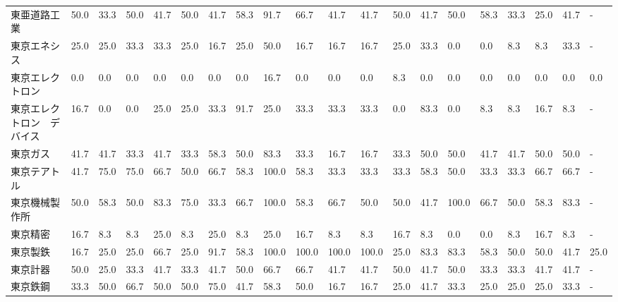 \documentclass[a4paper，11pt]{jsarticle}
\begin{document}
\begin{longtable}[c]{lp{3mm}p{3mm}p{3mm}p{3mm}p{3mm}p{3mm}p{3mm}p{3mm}p{3mm}p{3mm}p{3mm}p{3mm}p{3mm}p{3mm}p{3mm}p{3mm}p{3mm}p{3mm}p{3mm}}
東亜道路工業          &   50.0 &   33.3 &      50.0 &      41.7 &       50.0 &   41.7 &   58.3 &   91.7 &    66.7 &    41.7 &   41.7 &  50.0 &   41.7 &    50.0 &    58.3 &  33.3 &  25.0 &  41.7 &     - \\
東京エネシス          &   25.0 &   25.0 &      33.3 &      33.3 &       25.0 &   16.7 &   25.0 &   50.0 &    16.7 &    16.7 &   16.7 &  25.0 &   33.3 &     0.0 &     0.0 &   8.3 &   8.3 &  33.3 &     - \\
東京エレクトロン        &    0.0 &    0.0 &       0.0 &       0.0 &        0.0 &    0.0 &    0.0 &   16.7 &     0.0 &     0.0 &    0.0 &   8.3 &    0.0 &     0.0 &     0.0 &   0.0 &   0.0 &   0.0 &   0.0 \\
東京エレクトロン　デバイス   &   16.7 &    0.0 &       0.0 &      25.0 &       25.0 &   33.3 &   91.7 &   25.0 &    33.3 &    33.3 &   33.3 &   0.0 &   83.3 &     0.0 &     8.3 &   8.3 &  16.7 &   8.3 &     - \\
東京ガス            &   41.7 &   41.7 &      33.3 &      41.7 &       33.3 &   58.3 &   50.0 &   83.3 &    33.3 &    16.7 &   16.7 &  33.3 &   50.0 &    50.0 &    41.7 &  41.7 &  50.0 &  50.0 &     - \\
東京テアトル          &   41.7 &   75.0 &      75.0 &      66.7 &       50.0 &   66.7 &   58.3 &  100.0 &    58.3 &    33.3 &   33.3 &  33.3 &   58.3 &    50.0 &    33.3 &  33.3 &  66.7 &  66.7 &     - \\
東京機械製作所         &   50.0 &   58.3 &      50.0 &      83.3 &       75.0 &   33.3 &   66.7 &  100.0 &    58.3 &    66.7 &   50.0 &  50.0 &   41.7 &   100.0 &    66.7 &  50.0 &  58.3 &  83.3 &     - \\
東京精密            &   16.7 &    8.3 &       8.3 &      25.0 &        8.3 &   25.0 &    8.3 &   25.0 &    16.7 &     8.3 &    8.3 &  16.7 &    8.3 &     0.0 &     0.0 &   8.3 &  16.7 &   8.3 &     - \\
東京製鉄            &   16.7 &   25.0 &      25.0 &      66.7 &       25.0 &   91.7 &   58.3 &  100.0 &   100.0 &   100.0 &  100.0 &  25.0 &   83.3 &    83.3 &    58.3 &  50.0 &  50.0 &  41.7 &  25.0 \\
東京計器            &   50.0 &   25.0 &      33.3 &      41.7 &       33.3 &   41.7 &   50.0 &   66.7 &    66.7 &    41.7 &   41.7 &  50.0 &   41.7 &    50.0 &    33.3 &  33.3 &  41.7 &  41.7 &     - \\
東京鉄鋼            &   33.3 &   50.0 &      66.7 &      50.0 &       50.0 &   75.0 &   41.7 &   58.3 &    50.0 &    16.7 &   16.7 &  25.0 &   41.7 &    33.3 &    25.0 &  25.0 &  25.0 &  33.3 &     - \\

\end{longtable}
\end{document}
